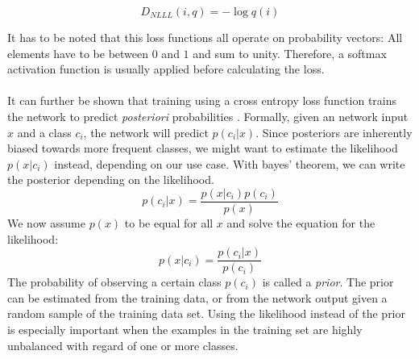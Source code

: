 \[
D_{NLLL}(i, q) = -\log q(i)
\]

It has to be noted that this loss functions all operate on probability vectors: All elements have to be between $0$ and $1$ and sum to unity. Therefore, a softmax activation function is usually applied before calculating the loss. \\ \\
It can further be shown that training using a cross entropy loss function trains the network to predict \textit{posteriori} probabilities \cite{richard1991neural}. Formally, given an network input $x$ and a class $c_i$, the network will predict $p(c_i|x)$. Since posteriors are inherently biased towards more frequent classes, we might want to estimate the likelihood $p(x|c_i)$ instead, depending on our use case. With bayes' theorem, we can write the posterior depending on the likelihood. 
\[
p(c_i|x) = \frac{p(x|c_i) p(c_i)}{p(x)}
\]
We now assume $p(x)$ to be equal for all $x$ and solve the equation for the likelihood:
\[
p(x|c_i) = \frac{p(c_i|x)}{p(c_i)}
\]
The probability of observing a certain class $p(c_i)$ is called a \textit{prior}. The prior can be estimated from the training data, or from the network output given a random sample of the training data set. Using the likelihood instead of the prior is especially important when the examples in the training set are highly unbalanced with regard of one or more classes. 
